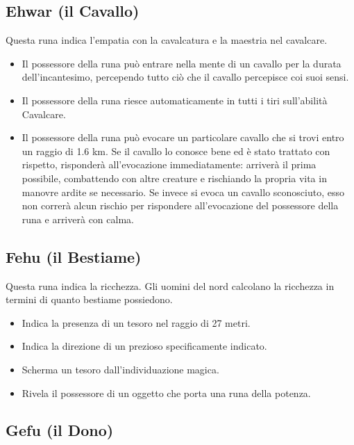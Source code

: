 \documentclass[10pt,a4paper]{article}
\begin{document}
 
\subsection*{Ehwar (il Cavallo)}
 
Questa runa indica l'empatia con la cavalcatura e la maestria nel cavalcare.
  \begin{itemize}
\item       Il possessore della runa pu\`{o} entrare nella mente di un cavallo per la durata dell'incantesimo, percependo tutto ci\`{o} che il cavallo percepisce coi suoi sensi.
 
\item       Il possessore della runa riesce automaticamente in tutti i tiri sull'abilit\`{a} Cavalcare.
 
\item        Il possessore della runa pu\`{o} evocare un particolare cavallo che si trovi entro un raggio di 1.6 km. Se il cavallo lo conosce bene ed \`{e} stato trattato con rispetto, risponder\`{a} all'evocazione immediatamente: arriver\`{a} il prima possibile, combattendo con altre creature e rischiando la propria vita in manovre ardite se necessario. Se invece si evoca un cavallo sconosciuto, esso non correr\`{a} alcun rischio per rispondere all'evocazione del possessore della runa e arriver\`{a} con calma.
 \end{itemize}
 
 
\subsection*{Fehu (il Bestiame)}
 
Questa runa indica la ricchezza. Gli uomini del nord calcolano la ricchezza in termini di quanto bestiame possiedono.
  \begin{itemize}
\item       Indica la presenza di un tesoro nel raggio di 27 metri.
 
\item       Indica la direzione di un prezioso specificamente indicato.
 
\item        Scherma un tesoro dall'individuazione magica.
 
\item        Rivela il possessore di un oggetto che porta una runa della potenza.
 \end{itemize}
 
 
\subsection*{Gefu (il Dono)}
 
\end{document}
